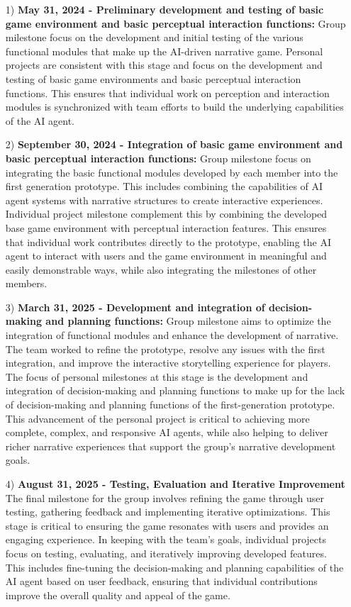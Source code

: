 \begin{itemize}
    \item [1)] 
    \textbf{May 31, 2024 - Preliminary development and testing of basic game environment and basic perceptual interaction functions:} 
    Group milestone focus on the development and initial testing of the various functional modules that make up the AI-driven narrative game. 
    Personal projects are consistent with this stage and focus on the development and testing of basic game environments and basic perceptual interaction functions. 
    This ensures that individual work on perception and interaction modules is synchronized with team efforts to build the underlying capabilities of the AI agent.
    \item [2)]
    \textbf{September 30, 2024 - Integration of basic game environment and basic perceptual interaction functions:} 
    Group milestone focus on integrating the basic functional modules developed by each member into the first generation prototype. 
    This includes combining the capabilities of AI agent systems with narrative structures to create interactive experiences. 
    Individual project milestone complement this by combining the developed base game environment with perceptual interaction features. 
    This ensures that individual work contributes directly to the prototype, enabling the AI agent to interact with users and the game environment in meaningful and easily demonstrable ways, while also integrating the milestones of other members.
    \item [3)]
    \textbf{March 31, 2025 - Development and integration of decision-making and planning functions:} 
    Group milestone aims to optimize the integration of functional modules and enhance the development of narrative. 
    The team worked to refine the prototype, resolve any issues with the first integration, and improve the interactive storytelling experience for players. 
    The focus of personal milestones at this stage is the development and integration of decision-making and planning functions to make up for the lack of decision-making and planning functions of the first-generation prototype. 
    This advancement of the personal project is critical to achieving more complete, complex, and responsive AI agents, while also helping to deliver richer narrative experiences that support the group’s narrative development goals.
    \item [4)]
    \textbf{August 31, 2025 - Testing, Evaluation and Iterative Improvement} 
    The final milestone for the group involves refining the game through user testing, gathering feedback and implementing iterative optimizations. 
    This stage is critical to ensuring the game resonates with users and provides an engaging experience. 
    In keeping with the team's goals, individual projects focus on testing, evaluating, and iteratively improving developed features. 
    This includes fine-tuning the decision-making and planning capabilities of the AI agent based on user feedback, ensuring that individual contributions improve the overall quality and appeal of the game.
\end{itemize}

